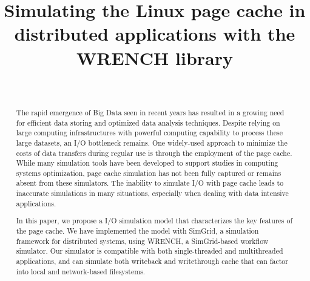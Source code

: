 \documentclass[conference]{IEEEtran}
\begin{document}
\title{Simulating the Linux page cache in distributed applications with the WRENCH library}

\author{\\
}

\maketitle

    \begin{abstract}

        
        The rapid emergence of Big Data seen in recent years has resulted in a 
        growing need for efficient data storing and optimized data analysis techniques. 
        Despite relying on large computing infrastructures with powerful computing capability 
        to process these large datasets, an I/O bottleneck remains. 
        One widely-used approach to minimize the costs of data transfers during
        regular use is through the employment of the page cache.
        While many simulation tools have been developed to 
        support studies in computing systems optimization, page cache simulation 
        has not been fully captured or remains absent from these simulators. 
        The inability to simulate I/O with page cache leads to inaccurate 
        simulations in many situations, especially when dealing with data intensive applications. 
        
        In this paper, we propose a I/O simulation model that characterizes the key features of the page cache.
        We have implemented the model with SimGrid, a simulation framework for 
        distributed systems, using WRENCH, a SimGrid-based workflow simulator. 
        Our simulator is compatible with both single-threaded and multithreaded applications,
        and can simulate both writeback and writethrough cache that can factor into local
        and network-based filesystems.
		
	\end{abstract}		 
\end{document}
